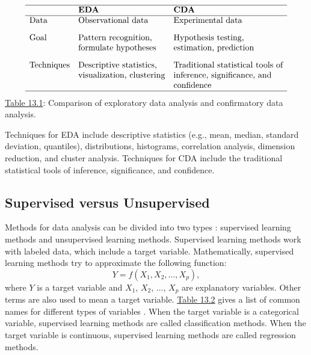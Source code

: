 \documentclass[]{book}
\theoremstyle{definition}
\theoremstyle{definition}
\theoremstyle{definition}
\theoremstyle{remark}
\begin{document}
\[\begin{matrix}
\begin{array}{lll} \hline
 & \textbf{EDA} & \textbf{CDA} \\\hline
\text{Data} & \text{Observational data} & \text{Experimental data}\\[3mm]
\text{Goal} & \text{Pattern recognition,}  & \text{Hypothesis testing,}  \\
& \text{formulate hypotheses} & \text{estimation, prediction} \\[3mm]
\text{Techniques} & \text{Descriptive statistics,} & \text{Traditional statistical tools of} \\
& \text{visualization, clustering} & \text{inference, significance, and}\\
& & \text{confidence} \\
\hline
\end{array}
\end{matrix}
\] \protect\hyperlink{tab:13.1}{Table 13.1}: Comparison of exploratory
data analysis and confirmatory data analysis.

Techniques for EDA include descriptive statistics (e.g., mean, median,
standard deviation, quantiles), distributions, histograms, correlation
analysis, dimension reduction, and cluster analysis. Techniques for CDA
include the traditional statistical tools of inference, significance,
and confidence.

\subsection{Supervised versus
Unsupervised}\label{supervised-versus-unsupervised}

Methods for data analysis can be divided into two types
\citep{abbott2014, igual2017}: supervised learning methods and
unsupervised learning methods. Supervised learning methods work with
labeled data, which include a target variable. Mathematically,
supervised learning methods try to approximate the following function:
\[
Y = f(X_1, X_2, \ldots, X_p),
\] where \(Y\) is a target variable and \(X_1\), \(X_2\), \(\ldots\),
\(X_p\) are explanatory variables. Other terms are also used to mean a
target variable. \protect\hyperlink{tab:13.2}{Table 13.2} gives a list
of common names for different types of variables \citep{frees2009}. When
the target variable is a categorical variable, supervised learning
methods are called classification methods. When the target variable is
continuous, supervised learning methods are called regression methods.
\end{document}
